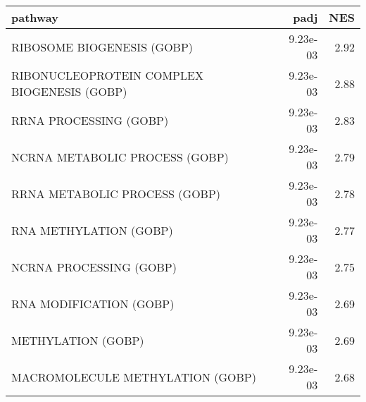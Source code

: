 \begin{tabular}{lrr}
\toprule
                                     pathway &      padj &   NES \\
\midrule
                  RIBOSOME BIOGENESIS (GOBP) &  9.23e-03 &  2.92 \\
 RIBONUCLEOPROTEIN COMPLEX BIOGENESIS (GOBP) &  9.23e-03 &  2.88 \\
                      RRNA PROCESSING (GOBP) &  9.23e-03 &  2.83 \\
              NCRNA METABOLIC PROCESS (GOBP) &  9.23e-03 &  2.79 \\
               RRNA METABOLIC PROCESS (GOBP) &  9.23e-03 &  2.78 \\
                      RNA METHYLATION (GOBP) &  9.23e-03 &  2.77 \\
                     NCRNA PROCESSING (GOBP) &  9.23e-03 &  2.75 \\
                     RNA MODIFICATION (GOBP) &  9.23e-03 &  2.69 \\
                          METHYLATION (GOBP) &  9.23e-03 &  2.69 \\
            MACROMOLECULE METHYLATION (GOBP) &  9.23e-03 &  2.68 \\
\bottomrule
\end{tabular}
